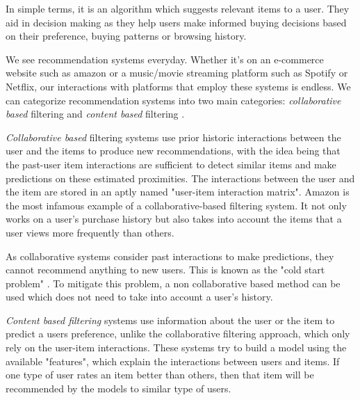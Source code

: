 \documentclass{bioinfo}
\begin{document}
In simple terms, it is an algorithm which suggests relevant items to a user. They aid in decision making as they help users make informed buying decisions based on their preference, buying patterns or browsing history.

We see recommendation systems everyday. Whether it's on an e-commerce website such as amazon or a music/movie streaming platform such as Spotify or Netflix, our interactions with platforms that employ these systems is endless. We can categorize recommendation systems into two main categories: \textit{collaborative based} filtering and \textit{content based} filtering \citep{balabanovic1997fab}.

\textit{Collaborative based} filtering systems use prior historic interactions between the user and the items to produce new recommendations, with the idea being that the past-user item interactions are sufficient to detect similar items and make predictions on these estimated proximities. The interactions between the user and the item are stored in an aptly named "user-item interaction matrix". Amazon is the most infamous example of a collaborative-based filtering system. It not only works on a user's purchase history but also takes into account the items that a user views more frequently than others.


As collaborative systems consider past interactions to make predictions, they cannot recommend anything to new users. This is known as the "cold start problem" \citep{lam2008addressing}. To mitigate this problem, a non collaborative based method can be used which does not need to take into account a user's history.

\textit{Content based filtering} systems use information about the user or the item to predict a users preference, unlike the collaborative filtering approach, which only rely on the user-item interactions. These systems try to build a model using the available "features", which explain the interactions between users and items. If one type of user rates an item better than others, then that item will be recommended by the models to similar type of users. 
\end{document}
